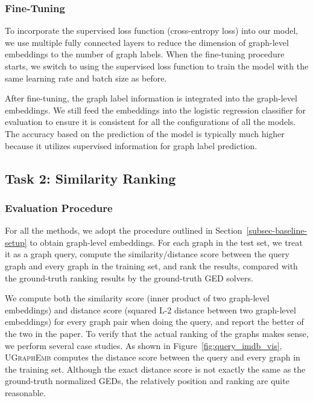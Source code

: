 \documentclass{article}
\newcommand{\model}{\textsc{UGraphEmb}\xspace}
\begin{document}
\subsubsection{Fine-Tuning}

To incorporate the supervised loss function (cross-entropy loss) into our model, we use multiple fully connected layers to reduce the dimension of graph-level embeddings to the number of graph labels. When the fine-tuning procedure starts, we switch to using the supervised loss function to train the model with the same learning rate and batch size as before. 

After fine-tuning, the graph label information is integrated into the graph-level embeddings. We still feed the embeddings into the logistic regression classifier for evaluation to ensure it is consistent for all the configurations of all the models. The accuracy based on the prediction of the model is typically much higher because it utilizes supervised information for graph label prediction. 




\subsection{Task 2: Similarity Ranking}

\subsubsection{Evaluation Procedure}

For all the methods, we adopt the procedure outlined in Section~\ref{subsec-baseline-setup} to obtain graph-level embeddings. For each graph in the test set, we treat it as a graph query, compute the similarity/distance score between the query graph and every graph in the training set, and rank the results, compared with the ground-truth ranking results by the ground-truth GED solvers.

We compute both the similarity score (inner product of two graph-level embeddings) and distance score (squared L-2 distance between two graph-level embeddings) for every graph pair when doing the query, and report the better of the two in the paper. To verify that the actual ranking of the graphs makes sense, we perform several case studies. As shown in Figure~\ref{fig:query_imdb_vis}, \model computes the distance score between the query and every graph in the training set. Although the exact distance score is not exactly the same as the ground-truth normalized GEDs, the relatively position and ranking are quite reasonable.
\end{document}
